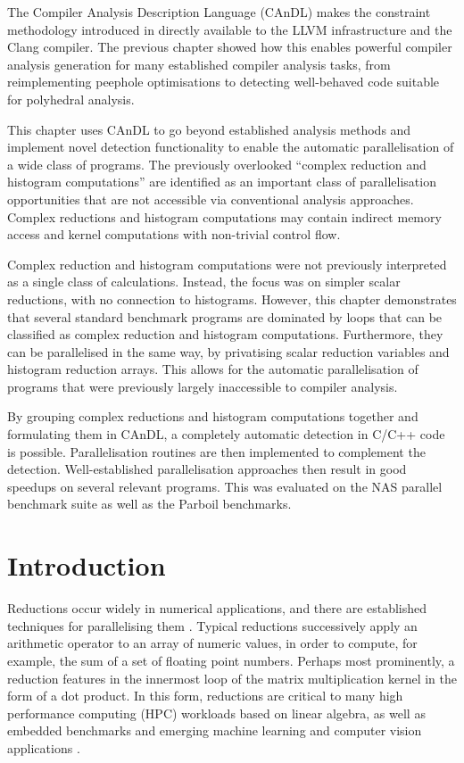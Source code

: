 
    The Compiler Analysis Description Language (CAnDL)
    makes the constraint methodology introduced in
    directly available to the LLVM infrastructure and the Clang compiler.
    The previous chapter showed how this enables powerful compiler analysis
    generation for many established compiler analysis tasks,
    from reimplementing peephole optimisations to detecting well-behaved code
    suitable for polyhedral analysis.

    This chapter uses CAnDL to go beyond established analysis methods and
    implement novel detection functionality to enable the automatic
    parallelisation of a wide class of programs.
    The previously overlooked ``complex reduction and histogram computations''
    are identified as an important class of parallelisation opportunities that
    are not accessible via conventional analysis approaches.
    Complex reductions and histogram computations may contain indirect memory
    access and kernel computations with non-trivial control flow.

    Complex reduction and histogram computations were not previously
    interpreted as a single class of calculations.
    Instead, the focus was on simpler scalar reductions, with no connection to
    histograms.
    However, this chapter demonstrates that several standard benchmark programs
    are dominated by loops that can be classified as complex reduction and
    histogram computations.
    Furthermore, they can be parallelised in the same way, by privatising scalar
    reduction variables and histogram reduction arrays.
    This allows for the automatic parallelisation of programs that were
    previously largely inaccessible to compiler analysis.

    By grouping complex reductions and histogram computations together and
    formulating them in CAnDL, a completely automatic detection in C/C++ code is
    possible.
    Parallelisation routines are then implemented to complement the detection.
    Well-established parallelisation approaches then result in good speedups on
    several relevant programs.
    This was evaluated on the NAS parallel benchmark suite as well as the
    Parboil benchmarks.

\section{Introduction}

    Reductions occur widely in numerical applications, and there are established
    techniques for parallelising them \citep{Jradi2017fast}.
    Typical reductions successively apply an arithmetic operator to an
    array of numeric values, in order to compute, for example, the sum of a set
    of floating point numbers.
    Perhaps most prominently, a reduction features in the innermost loop of the
    matrix multiplication kernel in the form of a dot product.
    In this form, reductions are critical to many high performance computing
    (HPC) workloads based on linear algebra, as well as embedded benchmarks and
    emerging machine learning and computer vision applications
    \citep{Reddy2016Reduction}.

